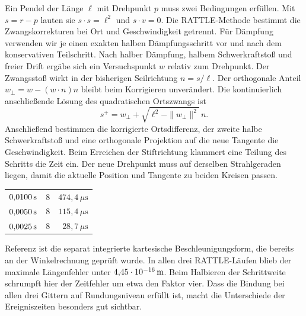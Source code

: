 Ein Pendel der Länge \(\ell\) mit Drehpunkt \(p\) muss zwei Bedingungen erfüllen. Mit \(s=r-p\) lauten sie \(s\cdot s=\ell^2\) und \(s\cdot v=0\). Die RATTLE-Methode bestimmt die Zwangskorrekturen bei Ort und Geschwindigkeit getrennt. Für Dämpfung verwenden wir je einen exakten halben Dämpfungsschritt vor und nach dem konservativen Teilschritt.
Nach halber Dämpfung, halbem Schwerkraftstoß und freier Drift ergäbe sich ein Versuchspunkt \(w\) relativ zum Drehpunkt. Der Zwangsstoß wirkt in der bisherigen Seilrichtung \(n=s/\ell\). Der orthogonale Anteil \(w_\perp=w-(w\cdot n)n\) bleibt beim Korrigieren unverändert. Die kontinuierlich anschließende Lösung des quadratischen Ortszwangs ist
\[
 s^+=w_\perp+\sqrt{\ell^2-\|w_\perp\|^2}\,n.
\]
Anschließend bestimmen die korrigierte Ortsdifferenz, der zweite halbe Schwerkraftstoß und eine orthogonale Projektion auf die neue Tangente die Geschwindigkeit. Beim Erreichen der Stiftrichtung klammert eine Teilung des Schritts die Zeit ein. Der neue Drehpunkt muss auf derselben Strahlgeraden liegen, damit die aktuelle Position und Tangente zu beiden Kreisen passen.
{\tblstart\begin{tabularx}{\linewidth}{@{}Yrr@{}}\toprule
{}&&\\\midrule
\(0{,}0100\,\mathrm{s}\)&8&\(474{,}4\,\mu\mathrm s\)\\
\(0{,}0050\,\mathrm{s}\)&8&\(115{,}4\,\mu\mathrm s\)\\
\(0{,}0025\,\mathrm{s}\)&8&\(28{,}7\,\mu\mathrm s\)\\\bottomrule\end{tabularx}\par}
Referenz ist die separat integrierte kartesische Beschleunigungsform, die bereits an der Winkelrechnung geprüft wurde. In allen drei RATTLE-Läufen blieb der maximale Längenfehler unter \(4{,}45\cdot10^{-16}\,\mathrm{m}\). Beim Halbieren der Schrittweite schrumpft hier der Zeitfehler um etwa den Faktor vier. Dass die Bindung bei allen drei Gittern auf Rundungsniveau erfüllt ist, macht die Unterschiede der Ereigniszeiten besonders gut sichtbar.

